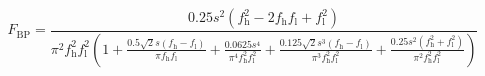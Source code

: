 \begin{equation}
F_{\mathrm{BP}} = \frac{0.25 s^{2} \left(f_{\mathrm{h}}^{2} - 2 f_{\mathrm{h}} f_{\mathrm{l}} + f_{\mathrm{l}}^{2}\right)}{\pi^{2} f_{\mathrm{h}}^{2} f_{\mathrm{l}}^{2} \left(1 + \frac{0.5 \sqrt{2} s \left(f_{\mathrm{h}} - f_{\mathrm{l}}\right)}{\pi f_{\mathrm{h}} f_{\mathrm{l}}} + \frac{0.0625 s^{4}}{\pi^{4} f_{\mathrm{h}}^{2} f_{\mathrm{l}}^{2}} + \frac{0.125 \sqrt{2} s^{3} \left(f_{\mathrm{h}} - f_{\mathrm{l}}\right)}{\pi^{3} f_{\mathrm{h}}^{2} f_{\mathrm{l}}^{2}} + \frac{0.25 s^{2} \left(f_{\mathrm{h}}^{2} + f_{\mathrm{l}}^{2}\right)}{\pi^{2} f_{\mathrm{h}}^{2} f_{\mathrm{l}}^{2}}\right)}
\end{equation}

